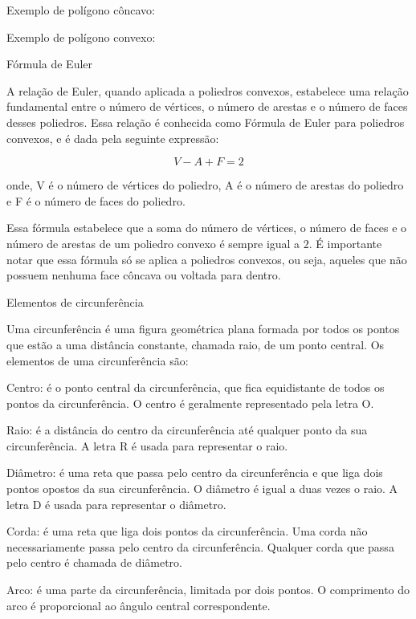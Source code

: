 Exemplo de polígono côncavo:


Exemplo de polígono convexo:


Fórmula de Euler

A relação de Euler, quando aplicada a poliedros convexos, estabelece uma
relação fundamental entre o número de vértices, o número de arestas e o
número de faces desses poliedros. Essa relação é conhecida como Fórmula
de Euler para poliedros convexos, e é dada pela seguinte expressão:

$$V - A + F = 2$$

onde, V é o número de vértices do poliedro, A é o número de arestas do
poliedro e F é o número de faces do poliedro.

Essa fórmula estabelece que a soma do número de vértices, o número de
faces e o número de arestas de um poliedro convexo é sempre igual a $2$. É
importante notar que essa fórmula só se aplica a poliedros convexos, ou
seja, aqueles que não possuem nenhuma face côncava ou voltada para
dentro.

Elementos de circunferência

Uma circunferência é uma figura geométrica plana formada por todos os
pontos que estão a uma distância constante, chamada raio, de um ponto
central. Os elementos de uma circunferência são:

Centro: é o ponto central da circunferência, que fica equidistante de
todos os pontos da circunferência. O centro é geralmente representado
pela letra O.

Raio: é a distância do centro da circunferência até qualquer ponto da
sua circunferência. A letra R é usada para representar o raio.

Diâmetro: é uma reta que passa pelo centro da circunferência e que liga
dois pontos opostos da sua circunferência. O diâmetro é igual a duas
vezes o raio. A letra D é usada para representar o diâmetro.

Corda: é uma reta que liga dois pontos da circunferência. Uma corda não
necessariamente passa pelo centro da circunferência. Qualquer corda que
passa pelo centro é chamada de diâmetro.

Arco: é uma parte da circunferência, limitada por dois pontos. O
comprimento do arco é proporcional ao ângulo central correspondente.

